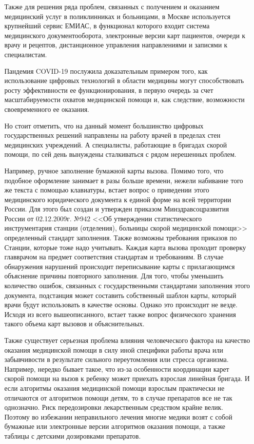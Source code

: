 Также для решения ряда проблем, связанных с получением и оказанием медицинский услуг в поликлинниках и больницами, в Москве используется крупнейший сервис ЕМИАС, в функционал которого входит система медицинского документооборота, электронные версии карт пациентов, очереди к врачу и рецептов, дистанционное управления направлениями и записями к специалистам.

Пандемия COVID-19 послужила доказательным примером того, как использование цифровых технологий в области медицины могут способствовать росту эффективности ее функционирования, в первую очередь за счет масштабируемости охватов медицинской помощи и, как следствие, возможности своевременного ее оказания.

Но стоит отметить, что на данный момент большинство цифровых государственных решений направлены на работу врачей в пределах стен медицинских учреждений.  А специалисты, работающие в бригадах скорой помощи, по сей день вынуждены сталкиваться с рядом нерешенных проблем.

Например, ручное заполнение бумажной карты вызова. Помимо того, что подобное оформление занимает в разы больше времени, нежели набивание того же текста с помощью клавиатуры, встает вопрос о приведении этого медицинского юридического документа к единой форме на всей территории России. Для этого был создан и утвержден приказом Минздравсоцразвития России от 02.12.2009г. №942 <<Об утверждении статистического инструментария станции (отделения), больницы скорой медицинской помощи>>  определенный стандарт заполнения. Также возможны требования приказов по Станции, которые тоже надо учитывать. Каждая карта вызова проходит проверку главврачом на предмет соответствия стандартам и требованиям. В случае обнаружения нарушений происходит переписывание карты с прилагающимся объяснение причины повторного заполнения. Для того, чтобы уменьшить количество ошибок, связанных с государственными стандартами заполнения этого документа, подстанция может составить собственный шаблон карты, который врачи будут использовать в качестве основы. Однако это происходит не везде. Исходя из всего вышеописанного, встает также вопрос физического хранения такого объема карт вызовов и объяснительных.

Также существует серьезная проблема влияния человеческого фактора на качество оказания медицинской помощи в силу иной специфики работы врача или забывчивости в результате сильного переутомления или стресса организма. Например, нередко бывает такое, что из-за особенности координации карет скорой помощи на вызов к ребенку может приехать взрослая линейная бригада. И если алгоритмы оказания медицинской помощи взрослым практически не отличаются от алгоритмов помощи детям, то в случае препаратов все не так однозначно. Риск передозировки лекарственным средством крайне велик. Поэтому во избежании неправильного лечения многие медики возят с собой бумажные или электронные версии алгоритмов оказания помощи, а также таблицы с детскими дозировками препаратов.

